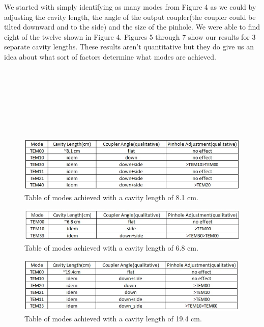 \documentclass{article}
\begin{document}
We started with simply identifying as many modes from Figure 4 as we could by adjusting the cavity length, the angle of the output coupler(the coupler could be tilted downward and to the side) and the size of the pinhole.  We were able to find eight of the twelve shown in Figure 4.  Figures 5 through 7 show our results for 3 separate cavity lengths.  These results aren't quantitative but they do give us an idea about what sort of factors determine what modes are achieved.  
\\
\\
\\
\\
\\
\\
\\
\\
\begin{figure}[H]
\includegraphics[scale=0.6,center]{Table1.jpg}
\caption{Table of modes achieved with a cavity length of 8.1 cm.}
\end{figure}

\begin{figure}[H]
\includegraphics[scale=0.6,center]{Table2.jpg}
\caption{Table of modes achieved with a cavity length of 6.8 cm.}
\end{figure}

\begin{figure}[H]
\includegraphics[scale=0.6,center]{Table3.jpg}
\caption{Table of modes achieved with a cavity length of 19.4 cm.}
\end{figure}


\newpage
\end{document}
